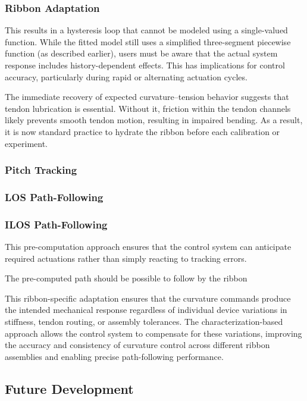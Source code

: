 \subsubsection{Ribbon Adaptation}
This results in a hysteresis loop that cannot be modeled using a single-valued function. While the fitted model still uses a simplified three-segment piecewise function (as described earlier), users must be aware that the actual system response includes history-dependent effects. This has implications for control accuracy, particularly during rapid or alternating actuation cycles.

The immediate recovery of expected curvature–tension behavior suggests that tendon lubrication is essential. Without it, friction within the tendon channels likely prevents smooth tendon motion, resulting in impaired bending. As a result, it is now standard practice to hydrate the ribbon before each calibration or experiment.



\subsubsection{Pitch Tracking}

\subsubsection{LOS Path-Following}

\subsubsection{ILOS Path-Following}

This pre-computation approach ensures that the control system can anticipate required actuations rather than simply reacting to tracking errors. 

The pre-computed path should be possible to follow by the ribbon

This ribbon-specific adaptation ensures that the curvature commands produce the intended mechanical response regardless of individual device variations in stiffness, tendon routing, or assembly tolerances. The characterization-based approach allows the control system to compensate for these variations, improving the accuracy and consistency of curvature control across different ribbon assemblies and enabling precise path-following performance.



\subsection{Future Development}

